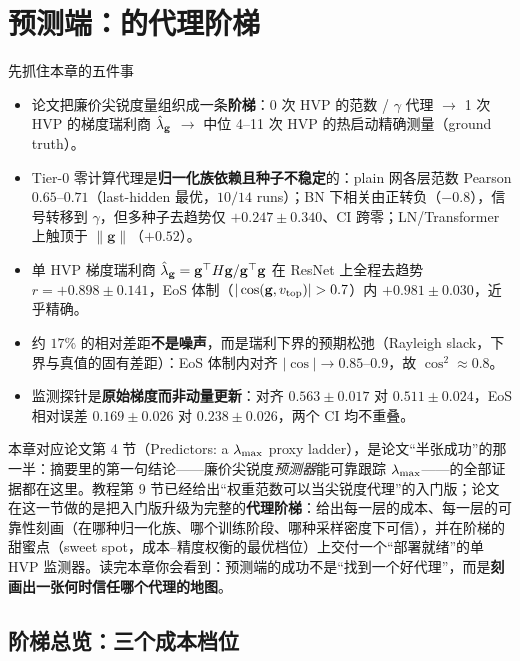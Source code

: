 \section{预测端：\lmax 的代理阶梯}
\label{sec:ch04}

\begin{keybox}{先抓住本章的五件事}
\begin{itemize}
  \item 论文把廉价尖锐度量组织成一条\textbf{阶梯}：0 次 HVP 的范数 / $\gamma$ 代理 $\to$ 1 次 HVP 的梯度瑞利商 $\hat{\lambda}_{\mathbf{g}}$ $\to$ 中位 4--11 次 HVP 的热启动精确测量（ground truth）。
  \item Tier-0 零计算代理是\textbf{归一化族依赖且种子不稳定}的：plain 网各层范数 Pearson $0.65$--$0.71$（last-hidden 最优，$10/14$ runs）；BN 下相关由正转负（$-0.8$），信号转移到 $\gamma$，但多种子去趋势仅 $+0.247\pm0.340$、CI 跨零；LN/Transformer 上触顶于 $\|\mathbf{g}\|$（$+0.52$）。
  \item 单 HVP 梯度瑞利商 $\hat{\lambda}_{\mathbf{g}}=\mathbf{g}^{\top}H\mathbf{g}/\mathbf{g}^{\top}\mathbf{g}$ 在 ResNet 上全程去趋势 $r=+0.898\pm0.141$，EoS 体制（$|\cos(\mathbf{g},\vtope)|>0.7$）内 $+0.981\pm0.030$，近乎精确。
  \item 约 $17\%$ 的相对差距\textbf{不是噪声}，而是瑞利下界的预期松弛（Rayleigh slack，下界与真值的固有差距）：EoS 体制内对齐 $|\cos|\!\to\!0.85$--$0.9$，故 $\cos^{2}\!\approx\!0.8$。
  \item 监测探针是\textbf{原始梯度而非动量更新}：对齐 $0.563\pm0.017$ 对 $0.511\pm0.024$，EoS 相对误差 $0.169\pm0.026$ 对 $0.238\pm0.026$，两个 CI 均不重叠。
\end{itemize}
\end{keybox}

\noindent 本章对应论文第 4 节（Predictors: a $\lambda_{\max}$ proxy
ladder），是论文“半张成功”的那一半：摘要里的第一句结论——廉价尖锐度\emph{预测器}能可靠跟踪
$\lambda_{\max}$——的全部证据都在这里。教程第 9
节已经给出“权重范数可以当尖锐度代理”的入门版；论文在这一节做的是把入门版升级为完整的\textbf{代理阶梯}：给出每一层的成本、每一层的可靠性刻画（在哪种归一化族、哪个训练阶段、哪种采样密度下可信），并在阶梯的甜蜜点（sweet spot，成本--精度权衡的最优档位）上交付一个“部署就绪”的单
HVP
监测器。读完本章你会看到：预测端的成功不是“找到一个好代理”，而是\textbf{刻画出一张何时信任哪个代理的地图}。

\subsection{阶梯总览：三个成本档位}
\label{sec:ch04-ladder}


